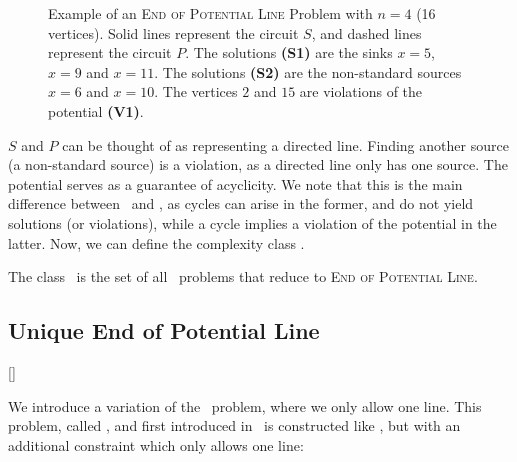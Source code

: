
\begin{figure}[ht]
	\centering
	\caption[Example of an \EOPL\ Problem]{Example of an \textsc{End of Potential Line} Problem with $n=4$ (16 vertices). Solid lines represent the circuit $S$, and dashed lines represent the circuit $P$. The solutions \textbf{(S1)} are the sinks $x=5$, $x=9$ and $x=11$. The solutions \textbf{(S2)} are the non-standard sources $x=6$ and $x=10$. The vertices $2$ and $15$ are violations of the potential \textbf{(V1)}.}\label{fig:eopl_example}
\end{figure}

$S$ and $P$ can be thought of as representing a directed line. Finding another source (a non-standard source) is a violation, as a directed line only has one source. The potential serves as a guarantee of acyclicity. We note that this is the main difference between \EndOfLine\ and \EndOfPotentialLine, as cycles can arise in the former, and do not yield solutions (or violations), while a cycle implies a violation of the potential in the latter. Now, we can define the complexity class \EOPL\@.

\begin{definition}[\EOPL]
	The class \EOPL\ is the set of all \TFNP\ problems that reduce to \textsc{End of Potential Line}.
\end{definition}

\subsection{Unique End of Potential Line}[\UEOPL]\label{sec:ueopl}

We introduce a variation of the \EndOfPotentialLine\ problem, where we only allow one line. This problem, called \UniqueEndOfPotentialLine, and first introduced in~ is constructed like \EndOfPotentialLine, but with an additional constraint which only allows one line:

